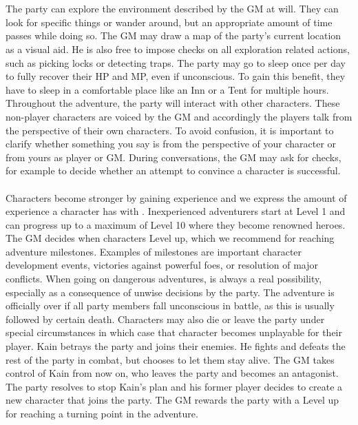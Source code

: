 %
\ofpar
%
\\\\
%
The party can explore the environment described by the GM at will.
They can look for specific things or wander around, but an appropriate amount of time passes while doing so.
The GM may draw a map of the party's current location as a visual aid. 
He is also free to impose checks on all exploration related actions, such as picking locks or detecting traps.
The party may go to sleep once per day to fully recover their HP and MP, even if unconscious.
To gain this benefit, they have to sleep in a comfortable place like an Inn or a Tent for multiple hours.
Throughout the adventure, the party will interact with other characters.
These non-player characters are voiced by the GM and accordingly the players talk from the perspective of their own characters.
To avoid confusion, it is important to clarify whether something you say is from the perspective of your character or from yours as player or GM.
During conversations, the GM may ask for checks, for example to decide whether an attempt to convince a character is successful.
%
\vfill
%
\\\\
%
Characters become stronger by gaining experience and we express the amount of experience a character has with .
Inexperienced adventurers start at Level 1 and can progress up to a maximum of Level 10 where they become renowned heroes. 
The GM decides when characters Level up, which we recommend for reaching adventure milestones.
Examples of milestones are important character development events, victories against powerful foes, or resolution of major conflicts. 
When going on dangerous adventures,  is always a real possibility, especially as a consequence of unwise decisions by the party. 
The adventure is officially over if all party members fall unconscious in battle, as this is usually followed by certain death. 
Characters may also die or leave the party under special circumstances in which case that character becomes unplayable for their player. 
%
\ofpar
%
{
	Kain betrays the party and joins their enemies. 
	He fights and defeats the rest of the party in combat, but chooses to let them stay alive.
	The GM takes control of Kain from now on, who leaves the party and becomes an antagonist.
	The party resolves to stop Kain's plan and his former player decides to create a new character that joins the party. 
	The GM rewards the party with a Level up for reaching a turning point in the adventure.
}
